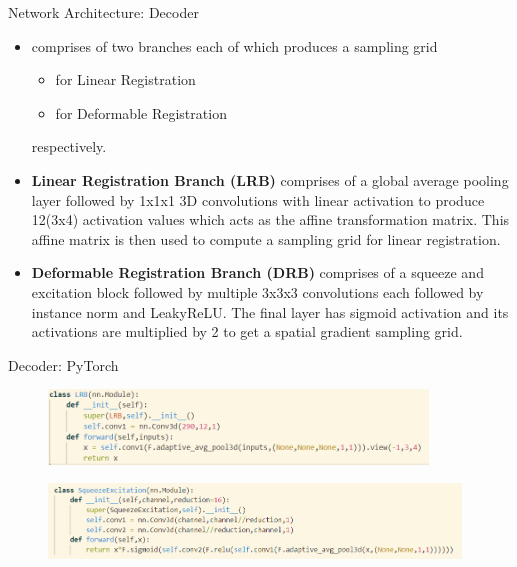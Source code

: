 \documentclass{beamer}
\begin{document}
\begin{frame}{Network Architecture: Decoder}
\begin{itemize}
    \item comprises of two branches each of which produces a sampling grid 
        \begin{itemize}
            \item for Linear Registration
            \item for Deformable Registration
        \end{itemize}
        respectively.
    \pause
    \item \textbf{Linear Registration Branch (LRB)} comprises of a global average pooling layer followed by 1x1x1 3D convolutions with linear activation to produce 12(3x4) activation values which acts as the affine transformation matrix. This affine matrix is then used to compute a sampling grid for linear registration.
    \pause
    \item \textbf{Deformable Registration Branch (DRB)} comprises of a squeeze and excitation block followed by multiple 3x3x3 convolutions each followed by instance norm and LeakyReLU. The final layer has sigmoid activation and its activations are multiplied by 2 to get a spatial gradient sampling grid.
\end{itemize}
\end{frame}
\begin{frame}{Decoder: PyTorch}
    
    \begin{figure}
        \centering
        \includegraphics[height=2cm]{LRB.PNG}
        \label{fig:code_decoder}
    \end{figure}

    \begin{figure}
        \centering
        \includegraphics[height=2cm]{seblock.PNG}
        \label{fig:code_decoder_2}
    \end{figure}
    
\end{frame}
\end{document}

